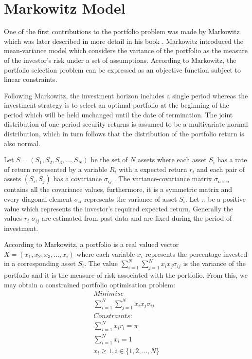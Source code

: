 \documentclass{pdfmx4020}
\begin{document}
  \section{Markowitz Model} %
  \label{sec:markowitz_model}
    One of the first contributions to the portfolio problem was made by Markowitz \cite{marko1} which was later described in more detail in his book \cite{marko2}. Markowitz introduced the mean-variance model which considers the variance of the portfolio as the measure of the investor's risk under a set of assumptions. According to Markowitz, the portfolio selection problem can be expressed as an objective function subject to linear constraints. 

    Following Markowitz, the investment horizon includes a single period whereas the investment strategy is to select an optimal portfolio at the beginning of the period which will be held unchanged until the date of termination. The joint distribution of one-period security returns is assumed to be a multivariate normal distribution, which in turn follows that the distribution of the portfolio return is also normal. 

    Let $S = (S_1,S_2,S_3, \dots , S_N)$ be the set of $N$ assets where each asset $S_i$ has a rate of return represented by a variable $R_i$ with a expected return $r_i$ and each pair of assets $(S_i,S_j)$ has a covariance $\sigma_{ij}$ . The variance-covariance matrix $\sigma_{n\times n}$ contains all the covariance values, furthermore, it is a symmetric matrix and every diagonal element $\sigma_{ii}$ represents the variance of asset $S_i$. Let $\pi$ be a positive value which represents the investor's required expected return. Generally the values $r_i$ $\sigma_{ij}$ are estimated from past data and are fixed during the period of investment. 

    According to Markowitz, a portfolio is a real valued vector $X = (x_1,x_2,x_3, \dots ,x_i)$ where each variable $x_i$ represents the percentage invested in a corresponding asset $S_i$. The value $\sum\limits_{i=1}^N \sum\limits_{j=1}^N x_i x_j \sigma_{ij}$ is the variance of the portfolio and it is the measure of risk associated with the portfolio. From this, we may obtain a constrained portfolio optimisation problem: 
    \begin{equation}
      \begin{split}
        Minimise \\
        \sum\limits_{i=1}^N \sum\limits_{j=1}^N x_i x_j \sigma_{ij} \\
        Constraints:\\
        \sum\limits_{i=1}^N x_i r_i = \pi \\
        \sum\limits_{i=1}^N x_i = 1 \\
        x_i \geq 1, i \in \{1,2,\dots,N\}
      \end{split}
    \end{equation}
\end{document}
